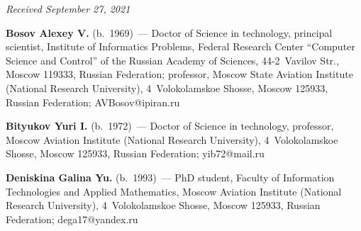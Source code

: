 \vspace*{-6pt}

\hfill{\small\textit{Received September 27, 2021}}



\Contr


\noindent
\textbf{Bosov Alexey V.} (b.\ 1969)~--- Doctor of Science in technology, principal scientist, Institute 
of Informatics Problems, Federal Research Center ``Computer Science and Control'' of the Russian 
Academy of Sciences, 44-2~Vavilov Str., Moscow 119333, Russian Federation; professor, Moscow 
State Aviation Institute (National Research University), 4~Volokolamskoe Shosse, Moscow 125933, 
Russian Federation; \mbox{AVBosov@ipiran.ru}


\vspace*{3pt}

\noindent
\textbf{Bityukov Yuri I.} (b.\ 1972)~--- Doctor of Science in technology, professor, Moscow Aviation 
Institute (National Research University), 4~Volokolamskoe Shosse, Moscow 125933, Russian 
Federation; \mbox{yib72@mail.ru}


\vspace*{3pt}

\noindent
\textbf{Deniskina Galina Yu.} (b.\ 1993)~--- PhD student, Faculty of Information Technologies and 
Applied Mathematics, Moscow Aviation Institute (National Research University), 4~Volokolamskoe 
Shosse, Moscow 125933, Russian Federation; \mbox{dega17@yandex.ru}

\label{end\stat}

\renewcommand{\bibname}{\protect\rm Литература} 